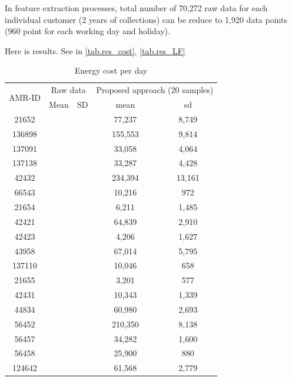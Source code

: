 \documentclass[conference]{IEEEtran}
\begin{document}
In feature extraction processes, total number of 70,272 raw data for each individual customer (2 years of collections) can be reduce to 1,920 data points (960 point for each working day and holiday).

Here is results. See in \ref{tab.res_cost}, \ref{tab.res_LF}

\begin{table}[]
  \caption{Energy cost per day}
  \begin{center}
  \begin{tabular}{ccccc}
  \hline
  \multirow{2}{*}{AMR-ID} & \multicolumn{2}{c}{Raw data}               & \multicolumn{2}{c}{Proposed approach (20 samples)}\\
                          & \multicolumn{1}{c}{Mean} & \multicolumn{1}{c}{SD} & \multicolumn{1}{c}{mean}  & \multicolumn{1}{c}{sd} \\
  \hline
                          21652 & & & 77,237 & 8,749 \\
                          136898 & & & 155,553 & 9,814 \\
                          137091 & & & 33,058 & 4,064 \\
                          137138 & & & 33,287 & 4,428 \\
                          42432 & & & 234,394 & 13,161 \\
                          66543 & & & 10,216 & 972 \\
                          21654 & & & 6,211 & 1,485 \\
                          42421 & & & 64,839 & 2,910 \\
                          42423 & & & 4,206 & 1,627 \\
                          43958 & & & 67,014 & 5,795 \\
                          137110 & & & 10,046 & 658 \\
                          21655 & & & 3,201 & 577 \\
                          42431 & & & 10,343 & 1,339 \\
                          44834 & & & 60,980 & 2,693 \\
                          56452 & & & 210,350 & 8,138 \\
                          56457 & & & 34,282 & 1,600 \\
                          56458 & & & 25,900 & 880 \\
                          124642 & & & 61,568 & 2,779 \\

\end{tabular}
\end{center}
\end{table}
\end{document}
